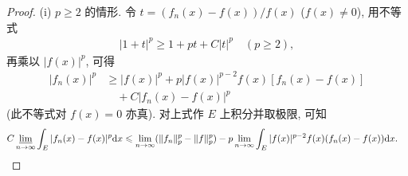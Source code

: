 \documentclass[../../main.tex]{subfiles}%
\begin{document}
\begin{proof}

(i) $p\geqslant 2$ 的情形. 令 $t=(f_n(x)-f(x))/f(x)$ ($f(x)\neq 0$), 用不等式
\begin{align}
|1+t|^p\geqslant 1+pt+C|t|^p\quad (p\geqslant 2), \label{eq:radon1}
\end{align}
再乘以 $|f(x)|^p$, 可得
\begin{align*}
|f_n(x)|^p &\geqslant |f(x)|^p + p|f(x)|^{p-2}f(x)[f_n(x)-f(x)] \\
&\quad + C|f_n(x)-f(x)|^p
\end{align*}
(此不等式对 $f(x)=0$ 亦真). 对上式作 $E$ 上积分并取极限, 可知
\begin{align*}
C\varliminf_{n\to\infty}\int_E |f_n(x)-f(x)|^p\mathrm{d}x
&\leqslant \lim_{n\to\infty}(\|f_n\|_p^p-\|f\|_p^p) - p\lim_{n\to\infty}\int_E |f(x)|^{p-2}f(x)(f_n(x)-f(x))\mathrm{d}x.
\end{align*}


\end{proof}
\end{document}
